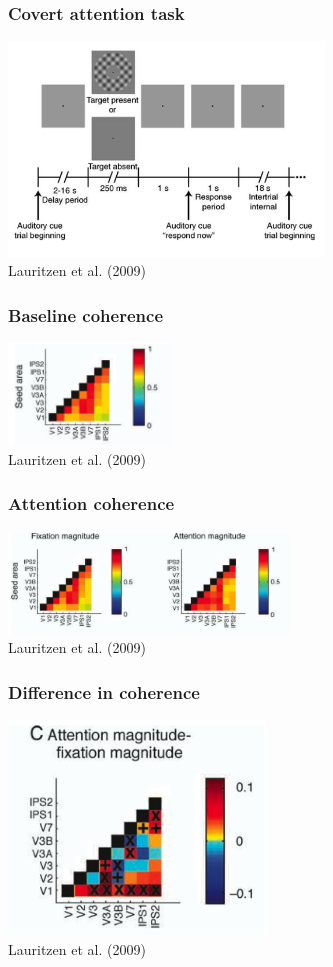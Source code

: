 \documentclass{beamer}
\begin{document}
\begin{frame}
\frametitle{Covert attention task}
\includegraphics[height=5.7cm]{figures/lauritzen2}
\\
\hfill 
Lauritzen et al. (2009)
\end{frame}

\begin{frame}
\frametitle{Baseline coherence}
\includegraphics[height=2.7cm]{figures/lauritzen3}
\\
\hfill 
Lauritzen et al. (2009)
\end{frame}

\begin{frame}
\frametitle{Attention coherence}
\includegraphics[height=2.7cm]{figures/lauritzen4}
\\
\hfill 
Lauritzen et al. (2009)
\end{frame}

\begin{frame}
\frametitle{Difference in coherence}
\includegraphics[height=5.7cm]{figures/lauritzen5}
\\
\hfill 
Lauritzen et al. (2009)
\end{frame}
\end{document}
